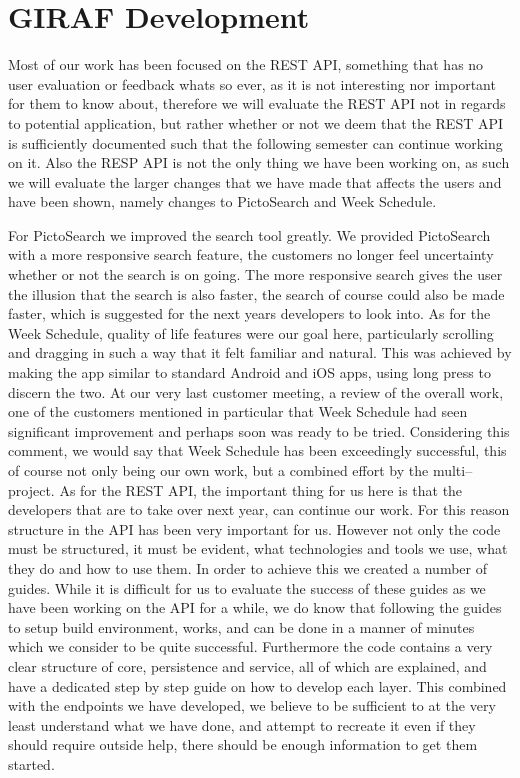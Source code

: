 \section{GIRAF Development}
Most of our work has been focused on the REST API, something that has no user evaluation or feedback whats so ever, as it is not interesting nor important for them to know about, therefore we will evaluate the REST API not in regards to potential application, but rather whether or not we deem that the REST API is sufficiently documented such that the following semester can continue working on it.
Also the RESP API is not the only thing we have been working on, as such we will evaluate the larger changes that we have made that affects the users and have been shown, namely changes to PictoSearch and Week Schedule.

For PictoSearch we improved the search tool greatly.
We provided PictoSearch with a more responsive search feature, the customers no longer feel uncertainty whether or not the search is on going.
The more responsive search gives the user the illusion that the search is also faster, the search of course could also be made faster, which is suggested for the next years developers to look into.
As for the Week Schedule, quality of life features were our goal here, particularly scrolling and dragging in such a way that it felt familiar and natural.
This was achieved by making the app similar to standard Android and iOS apps, using long press to discern the two.
At our very last customer meeting, a review of the overall work, one of the customers mentioned in particular that Week Schedule had seen significant improvement and perhaps soon was ready to be tried.
Considering this comment, we would say that Week Schedule has been exceedingly successful, this of course not only being our own work, but a combined effort by the multi--project.
\bigskip \noindent
As for the REST API, the important thing for us here is that the developers that are to take over next year, can continue our work.
For this reason structure in the API has been very important for us.
However not only the code must be structured, it must be evident, what technologies and tools we use, what they do and how to use them.
In order to achieve this we created a number of guides.
While it is difficult for us to evaluate the success of these guides as we have been working on the API for a while, we do know that following the guides to setup build environment, works, and can be done in a manner of minutes which we consider to be quite successful.
Furthermore the code contains a very clear structure of core, persistence and service, all of which are explained, and have a dedicated step by step guide on how to develop each layer.
This combined with the endpoints we have developed, we believe to be sufficient to at the very least understand what we have done, and attempt to recreate it even if they should require outside help, there should be enough information to get them started.

